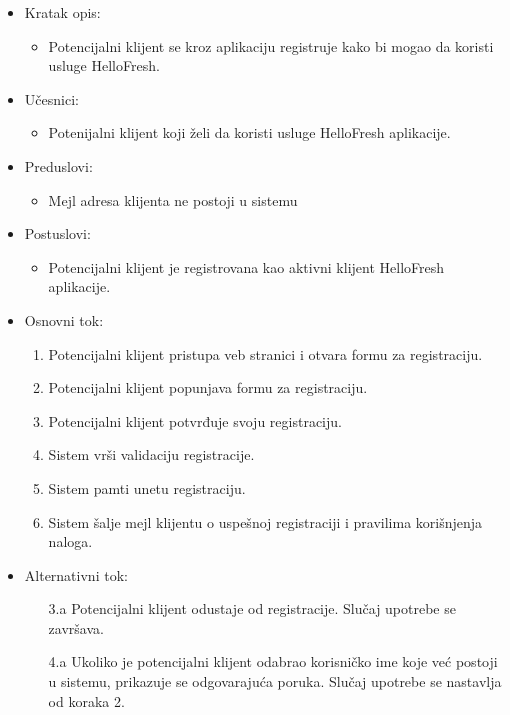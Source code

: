 
\begin{itemize}
    \item Kratak opis:
        \begin{itemize}
            \item Potencijalni klijent se kroz aplikaciju registruje kako bi mogao da koristi usluge HelloFresh.
        \end{itemize}
    \item Učesnici:
        \begin{itemize}
            \item Potenijalni klijent koji želi da koristi usluge HelloFresh aplikacije.
        \end{itemize}
    \item Preduslovi:
        \begin{itemize}
            \item Mejl adresa klijenta ne postoji u sistemu
        \end{itemize}
    \item Postuslovi:
        \begin{itemize}
            \item Potencijalni klijent je registrovana kao aktivni klijent HelloFresh aplikacije.
        \end{itemize}
    \item Osnovni tok:
        \begin{enumerate}
            \item Potencijalni klijent pristupa veb stranici i otvara formu za registraciju.
            \item Potencijalni klijent popunjava formu za registraciju.
            \item Potencijalni klijent potvrđuje svoju registraciju.
            \item Sistem vrši validaciju registracije.
            \item Sistem pamti unetu registraciju.
            \item Sistem šalje mejl klijentu o uspešnoj registraciji i pravilima korišnjenja naloga.
        \end{enumerate}
    \item Alternativni tok:
        \begin{itemize}
            \item[3.a] Potencijalni klijent odustaje od registracije. Slučaj upotrebe se završava.
            \item[4.a] Ukoliko je potencijalni klijent odabrao korisničko ime koje već postoji u sistemu, prikazuje se odgovarajuća poruka. Slučaj upotrebe se nastavlja od koraka 2.

\end{itemize}
\end{itemize}
